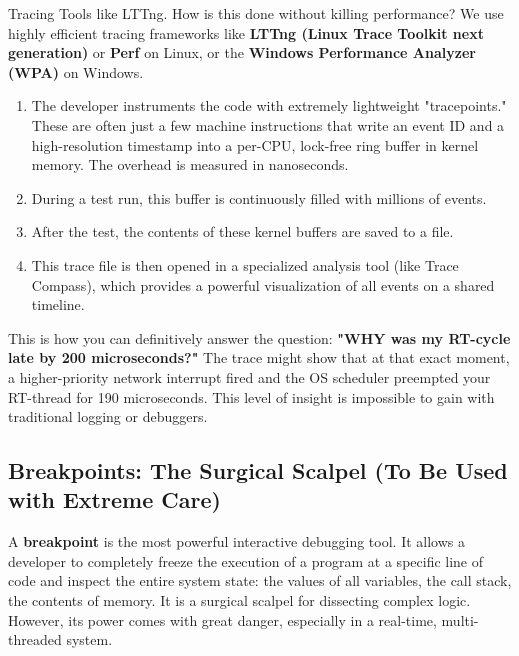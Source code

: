 \begin{tipbox}{Tracing Tools like LTTng.}
    How is this done without killing performance? We use highly efficient tracing frameworks like \textbf{LTTng (Linux Trace Toolkit next generation)} or \textbf{Perf} on Linux, or the \textbf{Windows Performance Analyzer (WPA)} on Windows.
    \begin{enumerate}
        \item The developer instruments the code with extremely lightweight "tracepoints." These are often just a few machine instructions that write an event ID and a high-resolution timestamp into a per-CPU, lock-free ring buffer in kernel memory. The overhead is measured in nanoseconds.
        \item During a test run, this buffer is continuously filled with millions of events.
        \item After the test, the contents of these kernel buffers are saved to a file.
        \item This trace file is then opened in a specialized analysis tool (like Trace Compass), which provides a powerful visualization of all events on a shared timeline.
    \end{enumerate}
    This is how you can definitively answer the question: \textbf{"WHY was my RT-cycle late by 200 microseconds?"} The trace might show that at that exact moment, a higher-priority network interrupt fired and the OS scheduler preempted your RT-thread for 190 microseconds. This level of insight is impossible to gain with traditional logging or debuggers.
\end{tipbox}

\subsection{Breakpoints: The Surgical Scalpel (To Be Used with Extreme Care)}
\label{subsec:breakpoints}

A \textbf{breakpoint} is the most powerful interactive debugging tool. It allows a developer to completely freeze the execution of a program at a specific line of code and inspect the entire system state: the values of all variables, the call stack, the contents of memory. It is a surgical scalpel for dissecting complex logic. However, its power comes with great danger, especially in a real-time, multi-threaded system.




